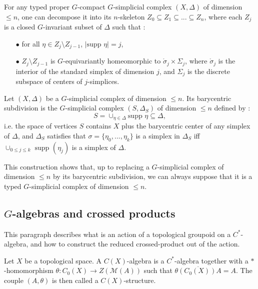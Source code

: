For any typed proper $G$-compact $G$-simplicial complex $(X,\Delta)$ of dimension $\leq n$, one can decompose it into its $n$-skeleton $Z_0\subseteq Z_1 \subseteq ... \subseteq Z_n$, where each $Z_j$ is a closed $G$-invariant subset of $\Delta$ such that :
\begin{itemize}
\item[$\bullet$] for all $\eta \in Z_j \setminus Z_{j-1}$, $|\text{supp }\eta|= j$,
\item[$\bullet$] $Z_j \setminus Z_{j-1}$ is $G$-equivariantly homeomorphic to $\mathring\sigma_j \times \Sigma_j$, where $\mathring\sigma_j $ is the interior of the standard simplex of dimension $j$, and $\Sigma_j$ is the discrete subspace of centers of $j$-simplices.
\end{itemize}

\begin{definition}
Let $(X,\Delta)$ be a $G$-simplicial complex of dimension $\leq n$. Its barycentric subdivision is the $G$-simplicial complex $(S,\Delta_S)$ of dimension $\leq n$ defined by :
\[S = \cup_{\eta\in \Delta}\text{supp } \eta\subseteq \Delta ,\]
i.e. the space of vertices $S$ contains $X$ plus the barycentric center of any simplex of $\Delta$, and $\Delta_S $ satisfies that $\sigma = \{ \eta_0, ...,\eta_k\}$ is a simplex in $\Delta_S$ iff $\cup_{0 \leq j \leq k}\text{ supp }(\eta_j)$ is a simplex of $\Delta$.
\end{definition}

This construction shows that, up to replacing a $G$-simplicial complex of dimension $\leq n$ by its barycentric subdivision, we can always suppose that it is a typed $G$-simplicial complex of dimension $\leq n$.

\subsection{$G$-algebras and crossed products}

This paragraph describes what is an action of a topological groupoid on a $C^*$-algebra, and how to construct the reduced crossed-product out of the action.

\begin{definition}
Let $X$ be a topological space. A $C(X)$-algebra is a $C^*$-algebra together with a $*$-homomorphism $\theta : C_0(X)\rightarrow Z(\mathcal M(A))$ such that $\overline{\theta (C_0(X)) A} = A$. The couple $(A,\theta)$ is then called a $C(X)$-structure.
\end{definition} 

